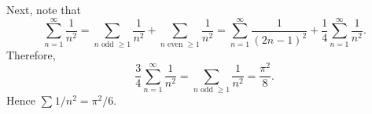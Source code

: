 \begin{exrc}[6]
\begin{soln}
\begin{enumerate}[(a)]
        Next, note that
        \begin{equation*}
            \sum_{n = 1}^{\infty} \frac{1}{n^2} 
            = \sum_{n \text{ odd } \geq 1}^{} \frac{1}{n^2} + \sum_{n \text{ even } \geq 1}^{} \frac{1}{n^2}
            = \sum_{n = 1}^{\infty} \frac{1}{(2n - 1)^2} + \frac{1}{4} \sum_{n = 1}^{\infty} \frac{1}{n^2}.
        \end{equation*}
        Therefore,
        \begin{equation*}
            \frac{3}{4} \sum_{n = 1}^{\infty} \frac{1}{n^2} = \sum_{n \text{ odd } \geq 1}^{} \frac{1}{n^2}
            = \frac{\pi^2}{8}.
        \end{equation*}
        Hence \(\sum_{}^{} 1 / n^2 = \pi^2 / 6\).
    \end{enumerate}

\end{soln}
\end{exrc}

